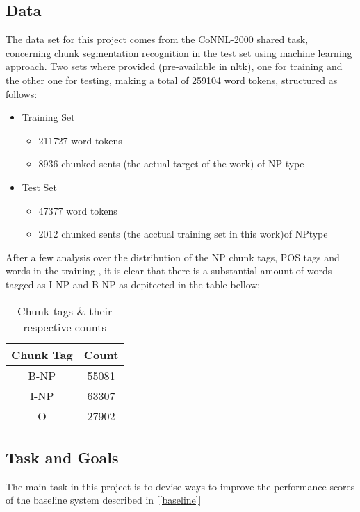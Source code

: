 \documentclass[11pt]{article}
\begin{document}
\subsection{Data}
The data set for this project comes from the CoNNL-2000 shared task, concerning chunk segmentation recognition in the test set using machine learning approach. Two sets where provided (pre-available in nltk), one for training and the other one for testing, making a total of 259104 word tokens, structured as follows:
\begin{itemize}
	\item Training Set
	\begin{itemize}
		\item 211727 word tokens
		\item 8936 chunked  sents (the actual target of the work) of NP type
	\end{itemize}
	\item Test Set
	\begin{itemize}
		\item 47377 word tokens
		\item 2012 chunked sents (the acctual training set in this work)of NPtype
	\end{itemize}
\end{itemize}
After a few analysis over the distribution of the NP chunk tags, POS tags and words in the training , it is clear that there is a substantial amount of words tagged as I-NP and B-NP as depitected in the table bellow:
\begin{table}
\begin{center}
	\begin{tabular}{|c|c|}
	\hline 
	Chunk Tag & Count \\
	\hline 
	B-NP & 55081 \\  
	\hline 
	I-NP & 63307  \\ 
	\hline 
	O & 27902  \\ 
	\hline 
	
\end{tabular}
\caption {Chunk tags \& their respective counts}
\end{center}
\end{table}
    
\subsection{Task and Goals}
The main task in this project is to devise ways to improve the performance scores of the baseline system described in [\ref{baseline}]
\end{document}
